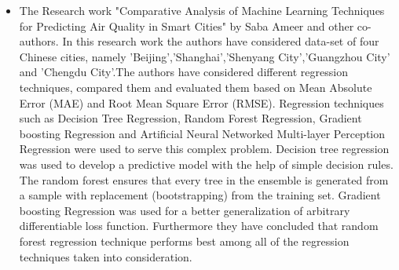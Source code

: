 \documentclass{article}
\begin{document}
\begin{itemize}
    \item The Research work "Comparative Analysis of Machine Learning Techniques for Predicting Air Quality in Smart Cities" by Saba Ameer and other co-authors\textsuperscript{\cite{ref21}}. In this research work the authors have considered data-set of four Chinese cities, namely 'Beijing','Shanghai','Shenyang City','Guangzhou City' and 'Chengdu City'.The authors have considered different regression techniques, compared them and evaluated them based on Mean Absolute Error (MAE) and Root Mean Square Error (RMSE). Regression techniques such as Decision Tree Regression, Random Forest Regression, Gradient boosting Regression and Artificial Neural Networked Multi-layer Perception Regression were used to serve this complex problem. Decision tree regression was used to develop a predictive model with the help of simple decision rules. The random forest ensures that every tree in the ensemble is generated from a sample with replacement (bootstrapping) from the training set\textsuperscript{\cite{ref22}}.  Gradient boosting Regression was used for a better generalization of arbitrary differentiable loss function. Furthermore they have concluded that random forest regression technique performs best among all of the regression techniques taken into consideration.
    



\end{itemize}
\end{document}

